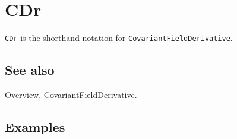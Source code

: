 \documentclass[../FeynCalcManual.tex]{subfiles}
\begin{document}
\hypertarget{cdr}{%
\section{CDr}\label{cdr}}

\texttt{CDr} is the shorthand notation for
\texttt{CovariantFieldDerivative}.

\subsection{See also}

\hyperlink{toc}{Overview},
\hyperlink{covariantfieldderivative}{CovariantFieldDerivative}.

\subsection{Examples}
\end{document}
